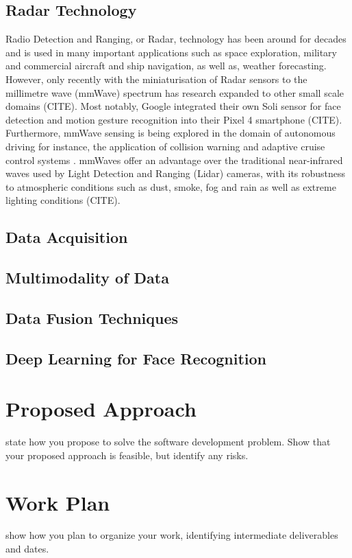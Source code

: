 \documentclass{interim}
\begin{document}
\subsection{Radar Technology}
Radio Detection and Ranging, or Radar, technology has been around for decades and is used in many important applications such as space exploration, military and commercial aircraft and ship navigation, as well as, weather forecasting. However, only recently with the miniaturisation of Radar sensors to the millimetre wave (mmWave) spectrum has research expanded to other small scale domains \cite{}(CITE). Most notably, Google integrated their own Soli sensor for face detection and motion gesture recognition into their Pixel 4 smartphone \cite{}(CITE). Furthermore, mmWave sensing is being explored in the domain of autonomous driving for instance, the application of collision warning and adaptive cruise control systems \cite{dfrobot}. mmWaves offer an advantage over the traditional near-infrared waves used by Light Detection and Ranging (Lidar) cameras, with its robustness to atmospheric conditions such as dust, smoke, fog and rain as well as extreme lighting conditions \cite{}(CITE).



\subsection{Data Acquisition}

\subsection{Multimodality of Data}

\subsection{Data Fusion Techniques}

\subsection{Deep Learning for Face Recognition}

\section{Proposed Approach}

state how you propose to solve the software development problem. Show that your proposed approach is feasible, but identify any risks.

\section{Work Plan}

show how you plan to organize your work, identifying intermediate deliverables and dates.



\end{document}
